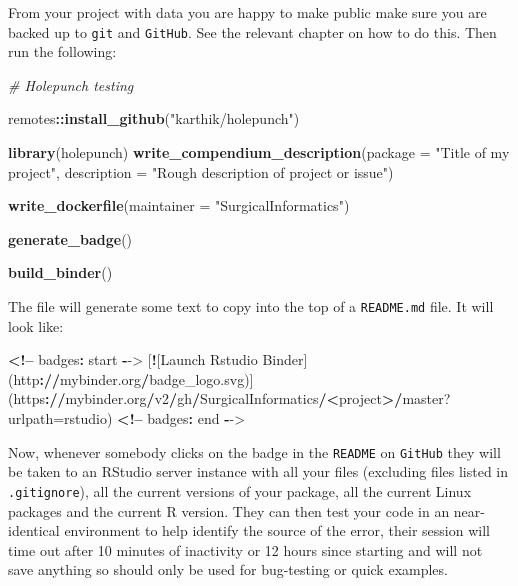 \documentclass[]{book}
\newenvironment{Shaded}{\begin{snugshade}}{\end{snugshade}}
\newcommand{\CommentTok}[1]{\textcolor[rgb]{0.56,0.35,0.01}{\textit{#1}}}
\newcommand{\DataTypeTok}[1]{\textcolor[rgb]{0.13,0.29,0.53}{#1}}
\newcommand{\ErrorTok}[1]{\textcolor[rgb]{0.64,0.00,0.00}{\textbf{#1}}}
\newcommand{\KeywordTok}[1]{\textcolor[rgb]{0.13,0.29,0.53}{\textbf{#1}}}
\newcommand{\NormalTok}[1]{#1}
\newcommand{\OperatorTok}[1]{\textcolor[rgb]{0.81,0.36,0.00}{\textbf{#1}}}
\newcommand{\StringTok}[1]{\textcolor[rgb]{0.31,0.60,0.02}{#1}}
\begin{document}
From your project with data you are happy to make public make sure you are backed up to \texttt{git} and \texttt{GitHub}. See the relevant chapter on how to do this. Then run the following:

\begin{Shaded}
\begin{Highlighting}[]
\CommentTok{# Holepunch testing}

\NormalTok{remotes}\OperatorTok{::}\KeywordTok{install_github}\NormalTok{(}\StringTok{"karthik/holepunch"}\NormalTok{)}

\KeywordTok{library}\NormalTok{(holepunch)}
\KeywordTok{write_compendium_description}\NormalTok{(}\DataTypeTok{package =} \StringTok{"Title of my project"}\NormalTok{, }
                             \DataTypeTok{description =} \StringTok{"Rough description of project or issue"}\NormalTok{)}

\KeywordTok{write_dockerfile}\NormalTok{(}\DataTypeTok{maintainer =} \StringTok{"SurgicalInformatics"}\NormalTok{)}

\KeywordTok{generate_badge}\NormalTok{()}

\KeywordTok{build_binder}\NormalTok{()}
\end{Highlighting}
\end{Shaded}

The file will generate some text to copy into the top of a \texttt{README.md} file. It will look like:

\begin{Shaded}
\begin{Highlighting}[]
\OperatorTok{<!--}\StringTok{ }\NormalTok{badges}\OperatorTok{:}\StringTok{ }\NormalTok{start }\OperatorTok{-}\NormalTok{->}
\NormalTok{[}\OperatorTok{!}\NormalTok{[Launch Rstudio Binder](http}\OperatorTok{:}\ErrorTok{//}\NormalTok{mybinder.org}\OperatorTok{/}\NormalTok{badge_logo.svg)](https}\OperatorTok{:}\ErrorTok{//}\NormalTok{mybinder.org}\OperatorTok{/}\NormalTok{v2}\OperatorTok{/}\NormalTok{gh}\OperatorTok{/}\NormalTok{SurgicalInformatics}\OperatorTok{/}\ErrorTok{<}\NormalTok{project}\OperatorTok{>}\ErrorTok{/}\NormalTok{master?}\DataTypeTok{urlpath=}\NormalTok{rstudio)}
\OperatorTok{<!--}\StringTok{ }\NormalTok{badges}\OperatorTok{:}\StringTok{ }\NormalTok{end }\OperatorTok{-}\NormalTok{->}
\end{Highlighting}
\end{Shaded}

Now, whenever somebody clicks on the badge in the \texttt{README} on \texttt{GitHub} they will be taken to an RStudio server instance with all your files (excluding files listed in \texttt{.gitignore}), all the current versions of your package, all the current Linux packages and the current R version. They can then test your code in an near-identical environment to help identify the source of the error, their session will time out after 10 minutes of inactivity or 12 hours since starting and will not save anything so should only be used for bug-testing or quick examples.
\end{document}
